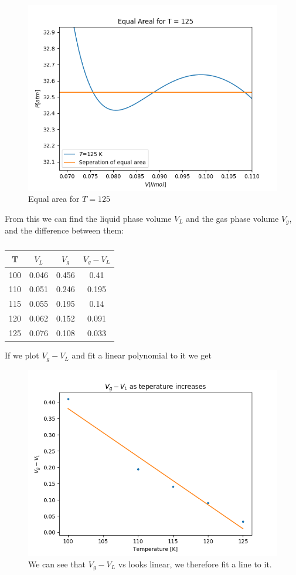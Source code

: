 \documentclass[a4paper,norsk, 10pt]{article}
\begin{document}
\begin{figure}[H]
\centering
\includegraphics[scale=0.3]{T125.png}
\caption{Equal area for $T=125$}
\label{fig:isoTherm}
\end{figure}

From this we can find the liquid phase volume $V_L$ and the gas phase volume $V_g$, and the difference between them:

\begin{table}[H]
\centering
\begin{tabular}{c|c|c|c}
T & $V_L$ & $V_g$ & $V_g - V_L$\\
\hline
100& 0.046 & 0.456 & 0.41\\
110 & 0.051 & 0.246 & 0.195\\
115 & 0.055 & 0.195 & 0.14\\
120 & 0.062 & 0.152 & 0.091\\
125 & 0.076 & 0.108 & 0.033
\end{tabular}
\caption{}
\end{table}

If we plot $V_g - V_L$ and fit a linear polynomial to it we get

\begin{figure}[H]
\centering
\includegraphics[scale=0.5]{VgVL.png}
\caption{We can see that $V_g - V_L$ vs looks linear, we therefore fit a line to it. }
\label{fig:isoTherm}
\end{figure}
\end{document}
